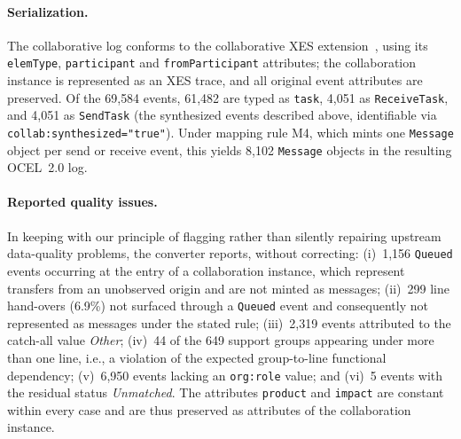 \paragraph{Serialization.}
The collaborative log conforms to the collaborative XES
extension~\citep{delgado2025collab}, using its \texttt{elemType},
\texttt{participant} and \texttt{fromParticipant} attributes; the
collaboration instance is represented as an XES trace, and all original event
attributes are preserved. Of the 69{,}584 events, 61{,}482 are typed as
\texttt{task}, 4{,}051 as \texttt{ReceiveTask}, and 4{,}051 as
\texttt{SendTask} (the synthesized events described above, identifiable via
\texttt{collab:synthesized="true"}). Under mapping rule M4, which mints one
\texttt{Message} object per send or receive event, this yields 8{,}102
\texttt{Message} objects in the resulting OCEL~2.0 log.

\paragraph{Reported quality issues.}
In keeping with our principle of flagging rather than silently repairing
upstream data-quality problems, the converter reports, without correcting:
(i)~1{,}156 \texttt{Queued} events occurring at the entry of a collaboration
instance, which represent transfers from an unobserved origin and are not
minted as messages; (ii)~299 line hand-overs (6.9\%) not surfaced through a
\texttt{Queued} event and consequently not represented as messages under the
stated rule; (iii)~2{,}319 events attributed to the catch-all value
\emph{Other}; (iv)~44 of the 649 support groups appearing under more than one
line, i.e., a violation of the expected group-to-line functional dependency;
(v)~6{,}950 events lacking an \texttt{org:role} value; and (vi)~5 events with
the residual status \emph{Unmatched}. The attributes \texttt{product} and
\texttt{impact} are constant within every case and are thus preserved as
attributes of the collaboration instance.


